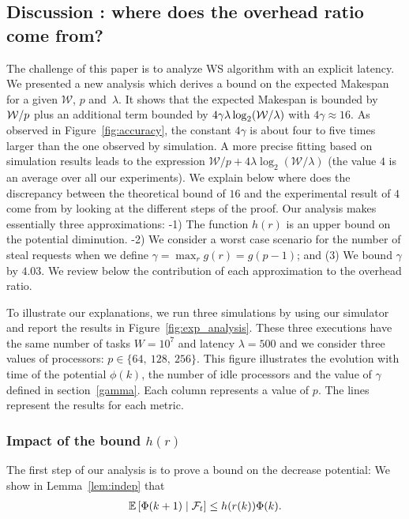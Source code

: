 \subsection{Discussion : where does the overhead ratio come from?}

The challenge of this paper is to analyze WS algorithm with an
explicit latency.  We presented a new analysis which derives a bound
on the expected Makespan for a given $\mathcal{W}$, $p$ and~$\lambda$.
It shows that the expected Makespan is bounded by $\mathcal{W}/p$ plus an
additional term bounded by $4\gamma\lambda\log_2(\mathcal{W}/\lambda)$ with
$4\gamma\approx16$.  As observed in Figure~\ref{fig:accuracy}, the
constant $4\gamma$ is about four to five times larger than the one
observed by simulation. A more precise fitting based on simulation
results leads to the expression
$\mathcal{W}/p + 4\lambda\log_2(\mathcal{W}/\lambda)$ (the value $4$
is an average over all our experiments). We explain below where does
the discrepancy between the theoretical bound of $16$ and the
experimental result of $4$ come from by looking at the different steps
of the proof.  Our analysis makes essentially three approximations:
-1) The function $h(r)$ is an upper bound on the potential diminution.
-2) We consider a worst case scenario for the number of steal requests
when we define $\gamma=\max_rg(r)=g(p-1)$; and (3) We bound $\gamma$
by $4.03$.  We review below the contribution of each approximation to
the overhead ratio.

To illustrate our explanations, we run three simulations by using our
simulator and report the results in Figure~\ref{fig:exp_analysis}.
These three executions have the same number of tasks $W=10^7$ and
latency $\lambda=500$ and we consider three values of processors:
$p\in\{64,\ 128,\ 256\}$. This figure illustrates the evolution with
time of the potential $\phi(k)$, the number of idle processors and the
value of $\gamma$ defined in section~\ref{gamma}. Each column
represents a value of $p$.  The lines represent the results for each
metric.



\subsubsection{Impact of the bound $h(r)$}
The first step of our analysis is to prove a bound on the decrease
potential: We show in Lemma~\ref{lem:indep} that
\begin{align}
  \label{eq:phi_exp}
  \esp{\Phi(k+1) \mid \calF_t} \le h(r(k)) \Phi(k). 
\end{align}

